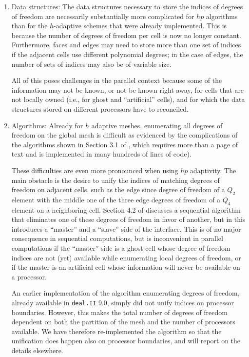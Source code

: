 \documentclass{ansarticle-preprint}
\newcommand{\specialword}[1]{\texttt{#1}}
\newcommand{\dealii}{{\specialword{deal.II}}\xspace}
\begin{document}
\begin{enumerate}
\item Data structures: The data structures necessary to store the
  indices of degrees of freedom are necessarily substantially more
  complicated for $hp$ algorithms than for the $h$-adaptive schemes
  that were already implemented. This is because the number of degrees
  of freedom per cell is now no longer constant. Furthermore,
  faces and edges may need to store more than one set of indices if
  the adjacent cells use different polynomial degrees; in the case of
  edges, the number of sets of indices may also be of variable size.

  All of this poses challenges in the parallel context because some of
  the information may not be known, or not be known right away, for
  cells that are not locally owned (i.e., for ghost and ``artificial''
  cells), and for which the data structures stored on different
  processors have to reconciled.

\item Algorithms: Already for $h$ adaptive meshes, enumerating all
  degrees of freedom on the global mesh is difficult as evidenced by
  the complications of the algorithms shown in Section 3.1 of
  \cite{BangerthBursteddeHeisterKronbichler11}, which requires more
  than a page of text and is implemented in many hundreds of lines of
  code).

  These difficulties are even more pronounced when using $hp$
  adaptivity. The main obstacle is the desire to unify the indices of
  matching degrees of freedom on adjacent cells, such as the edge
  since degree of freedom of a $Q_2$ element with the middle one of
  the three edge degrees of freedom of a $Q_4$ element on a
  neighboring cell. Section 4.2 of
  \cite{BangerthKayserHerold2007} discusses a sequential algorithm
  that eliminates one of these degrees of freedom in favor of another,
  but in this introduces a ``master'' and a ``slave'' side of the
  interface. This is of no major consequence in sequential
  computations, but is inconvenient in parallel computations if the
  ``master'' side is a ghost cell whose degree of freedom indices are
  not (yet) available while enumerating local degrees of freedom, or
  if the master is an artificial cell whose information will never be
  available on a processor.

  An earlier implementation of the algorithm enumerating degrees of
  freedom, already available in \dealii{} 9.0, simply did not unify
  indices on processor boundaries. However, this makes the total
  number of degrees of freedom dependent on both the partition of the
  mesh and the number of processors available. We have therefore
  re-implemented the algorithm so that the unification does happen
  also on processor boundaries, and will report on the details
  elsewhere.


\end{enumerate}
\end{document}
